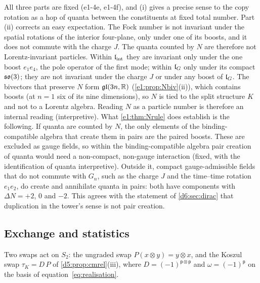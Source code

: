 All three parts are fixed (e1-4e, e1-4f), and (i) gives a precise sense to the copy rotation as a hop of quanta between the constituents
at fixed total number. Part (ii) corrects an easy expectation. The Fock number is not invariant under the spatial rotations of the
interior four-plane, only under one of its boosts, and it does not commute with the charge $J$. The quanta counted by $N$ are therefore
not Lorentz-invariant particles. Within $\mathfrak l_{\rm int}$ they are invariant only under the one boost $e_1e_4$, the pole operator of the first mode;
within $\mathfrak l_G$ only under its compact $\mathfrak{so}(3)$; they are not invariant under the charge $J$ or under any boost of $\mathfrak l_G$. The bivectors that preserve
$N$ form $\mathfrak{gl}(3n,\mathbb{R})$ (\cref{e1:prop:Nbiv}(ii)), which contains boosts (at $n=1$ six of its nine dimensions), so $N$ is tied to the
split structure $K$ and not to a Lorentz algebra. Reading $N$ as a particle number is therefore an internal reading (interpretive).
What \cref{e1:thm:Nrule} does establish is the following. If quanta are counted by $N$, the only elements of the binding-compatible algebra
that create them in pairs are the paired boosts. These are excluded as gauge fields, so within the binding-compatible algebra pair creation
of quanta would need a non-compact, non-gauge interaction (fixed, with the identification of quanta interpretive). Outside it, compact
gauge-admissible fields that do not commute with $G_n$, such as the charge $J$ and the time--time rotation $e_1e_2$, do create and annihilate
quanta in pairs: both have components with $\Delta N=+2$, $0$ and $-2$. This agrees with the
statement of \cref{d6:sec:dirac} that duplication in the tower's sense is not pair creation.

\subsection{Exchange and statistics}
\label{e1:sec:exchange}

Two swaps act on $S_2$: the ungraded swap $P(x\otimes y)=y\otimes x$, and the Koszul swap $\tau_K=D\,P$ of \cref{d5:prop:cmrel}(iii), where
$D=(-1)^{\mathsf p\otimes\mathsf p}$ and $\omega=(-1)^{\mathsf p}$ on the basis of equation~\cref{eq:realisation}.

